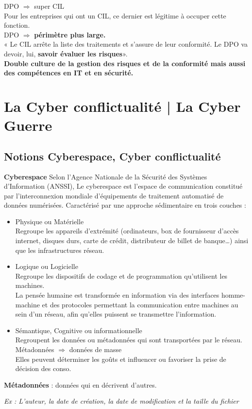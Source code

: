 \documentclass[a4paper,11pt]{report}
\begin{document}
DPO $\Rightarrow$ super CIL\\
Pour les entreprises qui ont un CIL, ce dernier est légitime à occuper cette fonction.\\
DPO $\Rightarrow$ \textbf{périmètre plus large.}\\
« Le CIL arrête la liste des traitements et s’assure de leur conformité. Le DPO va devoir, lui, \textbf{savoir évaluer les risques}».\\

\textbf{Double culture de la gestion des risques et de la conformité mais aussi des compétences en IT et en sécurité.}

\chapter{La Cyber conflictualité | La Cyber Guerre}
\section{Notions Cyberespace, Cyber conflictualité}
\textbf{Cyberespace}
Selon l’Agence Nationale de la Sécurité des Systèmes d’Information (ANSSI),
Le cyberespace est l’espace de communication constitué par l’interconnexion mondiale d’équipements de traitement automatisé de données numérisées.
Caractérisé par une approche sédimentaire en trois couches :
\begin{itemize}
    \item Physique ou Matérielle \\ 
    Regroupe les appareils d’extrémité (ordinateurs, box de fournisseur d’accès internet, disques durs, carte de crédit, distributeur de billet de banque…) ainsi que les infrastructures réseau.
    \item Logique ou Logicielle \\
    Regroupe les dispositifs de codage et de programmation qu’utilisent les machines.\\
    La pensée humaine est transformée en information via des interfaces homme-machine et des protocoles permettant la communication entre machines au sein d’un réseau, afin qu’elles puissent se transmettre l’information.\\
    \item Sémantique, Cognitive ou informationnelle \\
    Regroupent les données ou métadonnées qui sont transportées par le réseau. \\
    Métadonnées $\Rightarrow$ données de masse\\
    Elles peuvent déterminer les goûts et influencer ou favoriser la prise de décision des conso.\\
\end{itemize}


\textbf{Métadonnées} :  données qui en décrivent d’autres.

\textit{Ex : L’auteur, la date de création, la date de modification et la taille du fichier}
\end{document}
